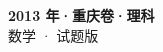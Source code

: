 \documentclass[zihao=-4, a4paper]{ctexart}
\begin{document}
\begin{center}
  {\Large\bfseries 2013 年·重庆卷·理科}\\[4pt]
  {\large 数学 · 试题版}
\end{center}
\medskip
{}

\end{document}

